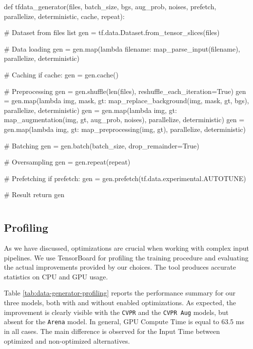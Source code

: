 \vspace{0.2cm}
\begin{python}
def tfdata_generator(files, batch_size, 
                     bgs, aug_prob, noises,
                     prefetch, parallelize, deterministic,
                     cache, repeat):

    # Dataset from files list
    gen = tf.data.Dataset.from_tensor_slices(files)
    
    # Data loading
    gen = gen.map(lambda filename: 
                    map_parse_input(filename),
                    parallelize, deterministic)

    # Caching
    if cache:
        gen = gen.cache()
    
    # Preprocessing
    gen = gen.shuffle(len(files), reshuffle_each_iteration=True)
    gen = gen.map(lambda img, mask, gt: 
                    map_replace_background(img, mask, gt, bgs),
                    parallelize, deterministic)
    gen = gen.map(lambda img, gt: 
                    map_augmentation(img, gt, aug_prob, noises), 
                    parallelize, deterministic)
    gen = gen.map(lambda img, gt: 
                    map_preprocessing(img, gt), 
                    parallelize, deterministic)

    # Batching
    gen = gen.batch(batch_size, drop_remainder=True)
    
    # Oversampling
    gen = gen.repeat(repeat)

    # Prefetching
    if prefetch:
        gen = gen.prefetch(tf.data.experimental.AUTOTUNE)

    # Result
    return gen
\end{python}
\vspace{-0.5cm}
\begin{lstlisting}[frame=none,caption={Chosen \texttt{tf.data} input pipeline}, 
label=lst:tfdata_generator]
\end{lstlisting}


\subsection{Profiling}

As we have discussed, optimizations are crucial when working with complex input pipelines. We use TensorBoard \cite{tensorboard} for profiling the training procedure and evaluating the actual improvements provided by our choices. The tool produces accurate statistics on CPU and GPU usage.

Table \ref{tab:data-generator-profiling} reports the performance summary for our three models, both with and without enabled optimizations. As expected, the improvement is clearly visible with the \texttt{CVPR} and the \texttt{CVPR Aug} models, but absent for the \texttt{Arena} model. In general, GPU Compute Time is equal to 63.5 ms in all cases. The main difference is observed for the Input Time between optimized and non-optimized alternatives.

